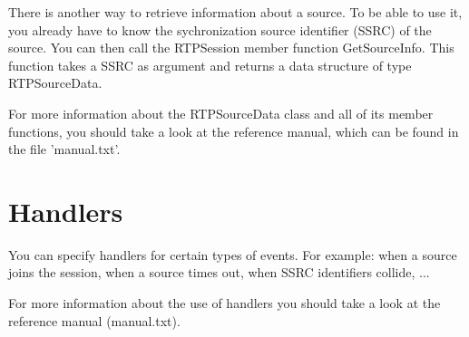     
    There is another way to retrieve information about a source. To be
able to use it, you already have to know the sychronization source identifier
(SSRC) of the source. You can then call the RTPSession member function
GetSourceInfo. This function takes a SSRC as argument and returns a data
structure of type RTPSourceData.
    
    
    For more information about the RTPSourceData class and all of its
member functions, you should take a look at the reference manual, which
can be found in the file 'manual.txt'.

\section{Handlers}

You can specify handlers for certain types of events. For example: when a
source joins the session, when a source times out, when SSRC identifiers
collide, ...
    
    
    For more information about the use of handlers you should take a look
at the reference manual (manual.txt).


